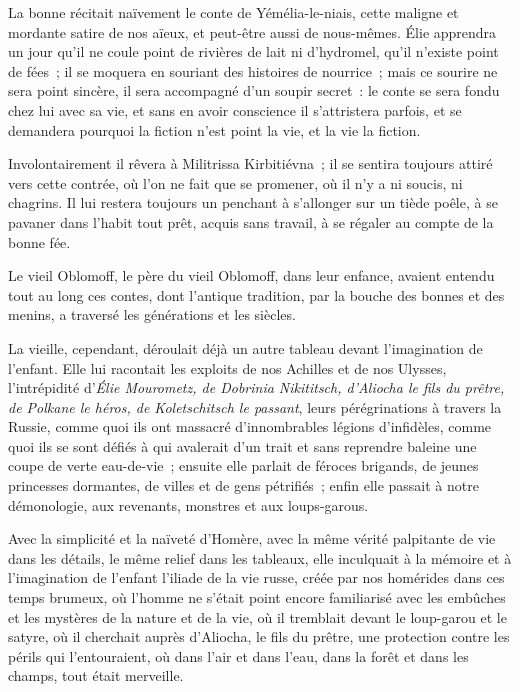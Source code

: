 \documentclass[french,twoside]{book} %
\begin{document}
La bonne récitait naïvement le conte de Yémélia-le-niais, cette maligne et mordante satire de nos aïeux, et peut-être aussi de nous-mêmes. Élie apprendra un jour qu’il ne coule point de rivières de lait ni d’hydromel, qu’il n’existe point de fées ; il se moquera en souriant des histoires de nourrice ; mais ce sourire ne sera point sincère, il sera accompagné d’un soupir secret : le conte se sera fondu chez lui avec sa vie, et sans en avoir conscience il s’attristera parfois, et se demandera pourquoi la fiction n’est point la vie, et la vie la fiction.\par
Involontairement il rêvera à Militrissa Kirbitiévna ; il se sentira toujours attiré vers cette contrée, où l’on ne fait que se promener, où il n’y a ni soucis, ni chagrins. Il lui restera toujours un penchant à s’allonger sur un tiède poêle, à se pavaner dans l’habit tout prêt, acquis sans travail, à se régaler au compte de la bonne fée.\par
Le vieil Oblomoff, le père du vieil Oblomoff, dans leur enfance, avaient entendu tout au long ces contes, dont l’antique tradition, par la bouche des bonnes et des menins, a traversé les générations et les siècles.\par
La vieille, cependant, déroulait déjà un autre tableau devant l’imagination de l’enfant. Elle lui racontait les exploits de nos Achilles et de nos Ulysses, l’intrépidité d’\emph{Élie Mourometz, de Dobrinia Nikititsch, d’Aliocha le fils du prêtre, de Polkane le héros, de Koletschitsch le passant}, leurs pérégrinations à travers la Russie, comme quoi ils ont massacré d’innombrables légions d’infidèles, comme quoi ils se sont défiés à qui avalerait d’un trait et sans reprendre baleine une coupe de verte eau-de-vie ; ensuite elle parlait de féroces brigands, de jeunes princesses dormantes, de villes et de gens pétrifiés ; enfin elle passait à notre démonologie, aux revenants, monstres et aux loups-garous.\par
Avec la simplicité et la naïveté d’Homère, avec la même vérité palpitante de vie dans les détails, le même relief dans les tableaux, elle inculquait à la mémoire et à l’imagination de l’enfant l’iliade de la vie russe, créée par nos homérides dans ces temps brumeux, où l’homme ne s’était point encore familiarisé avec les embûches et les mystères de la nature et de la vie, où il tremblait devant le loup-garou et le satyre, où il cherchait auprès d’Aliocha, le fils du prêtre, une protection contre les périls qui l’entouraient, où dans l’air et dans l’eau, dans la forêt et dans les champs, tout était merveille.\par
\end{document}
